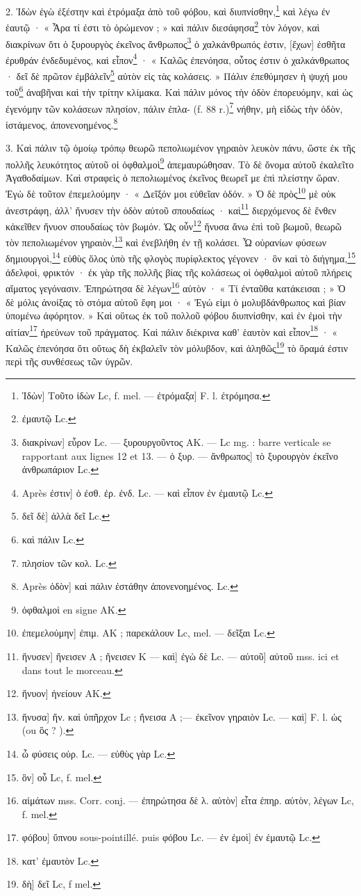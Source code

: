 \documentclass[landscape, a4paper, 11pt, oneside, polutonikogreek, french]{article}
\begin{document}
2. Ἰδὼν ἐγὼ ἐξέστην καὶ ἐτρόμαξα ἀπὸ τοῦ φόβου, καὶ διυπνίσθην,\footnote{Ἰδὼν] Τοῦτο ἰδὼν Lc, f. mel. --- ἐτρόμαξα] F. l. ἐτρόμησα.} καὶ λέγω ἐν ἑαυτῷ · « Ἆρα τί ἐστι τὸ ὁρώμενον ; » καὶ πάλιν διεσάφησα\footnote{ἐμαυτῷ Lc.} τὸν λόγον, καὶ διακρίνων ὅτι ὁ ξυρουργὸς ἐκεῖνος ἄνθρωπος\footnote{διακρίνων] εὗρον Lc. --- ξυρουργοῦντος AK. --- Lc mg. : barre verticale se rapportant aux lignes 12 et 13. --- ὁ ξυρ. --- ἄνθρωπος] τὸ ξυρουργὸν ἐκεῖνο ἀνθρωπάριον Lc.} ὁ χαλκάνθρωπός ἐστιν, [ἔχων] ἐσθῆτα ἐρυθράν ἐνδεδυμένος, καὶ εἶπον\footnote{Après ἐστιν] ὁ ἐσθ. ἐρ. ἐνδ. Lc. --- καὶ εἶπον ἐν ἐμαυτῷ Lc.} · « Καλῶς ἐπενόησα, οὗτος ἐστιν ὁ χαλκάνθρωπος · δεῖ δὲ πρῶτον ἐμβάλεῖν\footnote{δεῖ δὲ] ἀλλὰ δεῖ Lc.} αὐτὸν εἰς τὰς κολάσεις. » Πάλιν ἐπεθύμησεν ἡ ψυχή μου τοῦ\footnote{καὶ πάλιν Lc.} ἀναβῆναι καὶ τὴν τρίτην κλίμακα. Καὶ πάλιν μόνος τὴν ὁδὸν ἐπορευόμην, καὶ ὡς ἐγενόμην τῶν κολάσεων πλησίον, πάλιν ἐπλα- (f. 88 r.)\footnote{πλησίον τῶν κολ. Lc.} νήθην, μὴ εἰδὼς τὴν ὁδὸν, ἱστάμενος, ἀπονενοημένος.\footnote{Après ὁδὸν] καὶ πάλιν ἐστάθην ἀπονενοημένος. Lc.}

3. Καὶ πάλιν τῷ ὁμοίῳ τρόπῳ θεωρῶ πεπολιωμένον γηραιὸν λευκὸν πάνυ, ὥστε ἐκ τῆς πολλῆς λευκότητος αὐτοῦ οἱ ὀφθαλμοὶ\footnote{ὀφθαλμοὶ en signe AK.} ἀπεμαυρώθησαν. Τὸ δὲ ὄνομα αὐτοῦ ἐκαλεῖτο Ἀγαθοδαίμων. Καὶ στραφεὶς ὁ πεπολιωμένος ἐκεῖνος θεωρεῖ με ἐπὶ πλείστην ὥραν. Ἐγὼ δὲ τοῦτον ἐπεμελούμην · « Δεῖξόν μοι εὐθεῖαν ὁδόν. » Ὁ δὲ πρὸς\footnote{ἐπεμελούμην] ἐπιμ. AK ; παρεκάλουν Lc, mel. --- δεῖξαι Lc.} μὲ οὐκ ἀνεστράφη, ἀλλ' ἤνυσεν τὴν ὁδὸν αὐτοῦ σπουδαίως · καὶ\footnote{ἤνυσεν] ἤνεισεν A ; ἥνεισεν K --- καὶ] ἐγὼ δὲ Lc. --- αὑτοῦ] αὐτοῦ mss. ici et dans tout le morceau.} διερχόμενος δὲ ἔνθεν κἀκεῖθεν ἤνυον σπουδαίως τὸν βωμόν. Ὡς οὖν\footnote{ἤνυον] ἠνείουν AK.} ἤνυσα ἄνω ἐπὶ τοῦ βωμοῦ, θεωρῶ τὸν πεπολιωμένον γηραιὸν,\footnote{ἤνυσα] ἤν. καὶ ὐπῆρχον Lc ; ἤνεισα A ;--- ἐκεῖνον γηραιὸν Lc. --- καὶ] F. l. ὡς (ou ὃς ? ).} καὶ ἐνεβλήθη ἐν τῇ κολάσει. Ὦ οὐρανίων φύσεων δημιουργοὶ,\footnote{ὦ φύσεις οὐρ. Lc. --- εὐθὺς γὰρ Lc.} εὐθὺς ὅλος ὑπὸ τῆς φλογὸς πυρίφλεκτος γέγονεν · ὃν καὶ τὸ διήγημα,\footnote{ὃν] οὗ Lc, f. mel.} ἀδελφοὶ, φρικτόν · ἐκ γὰρ τῆς πολλῆς βίας τῆς κολάσεως οἱ ὀφθαλμοὶ αὐτοῦ πλήρεις αἵματος γεγόνασιν. Ἐπηρώτησα δὲ λέγων\footnote{αἱμάτων mss. Corr. conj. --- ἐπηρώτησα δὲ λ. αὐτὸν] εἶτα ἐπηρ. αύτὸν, λέγων Lc, f. mel.} αὐτὸν · « Τί ἐνταῦθα κατάκεισαι ; » Ὁ δὲ μόλις ἀνοίξας τὸ στόμα αὑτοῦ ἔφη μοι · « Ἐγώ εἰμι ὁ μολυβδάνθρωπος καὶ βίαν ὑπομένω ἀφόρητον. » Καὶ οὕτως ἐκ τοῦ πολλοῦ φόβου διυπνίσθην, καὶ ἐν ἐμοὶ τὴν αἰτίαν\footnote{φόβου] ὕπνου sous-pointillé. puis φόβου Lc. --- ἐν ἐμοὶ] ἐν ἐμαυτῷ Lc.} ἠρεύνων τοῦ πράγματος. Καὶ πάλιν διέκρινα καθ' ἑαυτὸν καὶ εἶπον\footnote{κατ' ἐμαυτὸν Lc.} · « Καλῶς ἐπενόησα ὅτι οὕτως δὴ ἐκβαλεῖν τὸν μόλυβδον, καὶ ἀληθῶς\footnote{δὴ] δεῖ Lc, f mel.} τὸ ὅραμά ἐστιν περὶ τῆς συνθέσεως τῶν ὑγρῶν.
\end{document}
